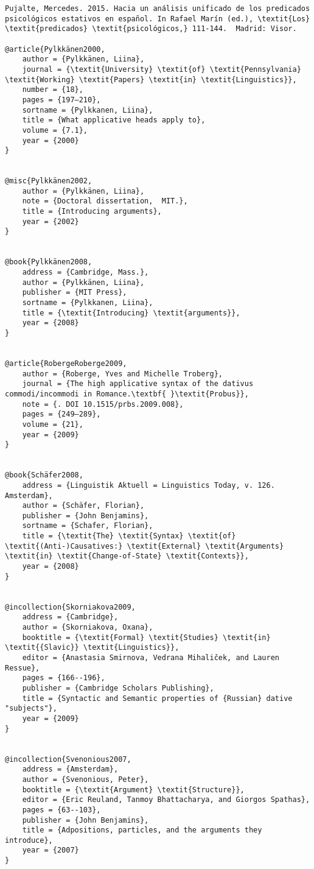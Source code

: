 \documentclass[output=paper,modfonts,nonflat]{langsci/langscibook}
\begin{document}
\begin{verbatim}
Pujalte, Mercedes. 2015. Hacia un análisis unificado de los predicados psicológicos estativos en español. In Rafael Marín (ed.), \textit{Los} \textit{predicados} \textit{psicológicos,} 111-144.  Madrid: Visor.

@article{Pylkkänen2000,
	author = {Pylkkänen, Liina},
	journal = {\textit{University} \textit{of} \textit{Pennsylvania} \textit{Working} \textit{Papers} \textit{in} \textit{Linguistics}},
	number = {18},
	pages = {197–210},
	sortname = {Pylkkanen, Liina},
	title = {What applicative heads apply to},
	volume = {7.1},
	year = {2000}
}


@misc{Pylkkänen2002,
	author = {Pylkkänen, Liina},
	note = {Doctoral dissertation,  MIT.},
	title = {Introducing arguments},
	year = {2002}
}


@book{Pylkkänen2008,
	address = {Cambridge, Mass.},
	author = {Pylkkänen, Liina},
	publisher = {MIT Press},
	sortname = {Pylkkanen, Liina},
	title = {\textit{Introducing} \textit{arguments}},
	year = {2008}
}


@article{RobergeRoberge2009,
	author = {Roberge, Yves and Michelle Troberg},
	journal = {The high applicative syntax of the dativus commodi/incommodi in Romance.\textbf{ }\textit{Probus}},
	note = {. DOI 10.1515/prbs.2009.008},
	pages = {249–289},
	volume = {21},
	year = {2009}
}


@book{Schäfer2008,
	address = {Linguistik Aktuell = Linguistics Today, v. 126. Amsterdam},
	author = {Schäfer, Florian},
	publisher = {John Benjamins},
	sortname = {Schafer, Florian},
	title = {\textit{The} \textit{Syntax} \textit{of} \textit{(Anti-)Causatives:} \textit{External} \textit{Arguments} \textit{in} \textit{Change-of-State} \textit{Contexts}},
	year = {2008}
}


@incollection{Skorniakova2009,
	address = {Cambridge},
	author = {Skorniakova, Oxana},
	booktitle = {\textit{Formal} \textit{Studies} \textit{in} \textit{{Slavic}} \textit{Linguistics}},
	editor = {Anastasia Smirnova, Vedrana Mihaliček, and Lauren Ressue},
	pages = {166--196},
	publisher = {Cambridge Scholars Publishing},
	title = {Syntactic and Semantic properties of {Russian} dative "subjects"},
	year = {2009}
}


@incollection{Svenonious2007,
	address = {Amsterdam},
	author = {Svenonious, Peter},
	booktitle = {\textit{Argument} \textit{Structure}},
	editor = {Eric Reuland, Tanmoy Bhattacharya, and Giorgos Spathas},
	pages = {63--103},
	publisher = {John Benjamins},
	title = {Adpositions, particles, and the arguments they introduce},
	year = {2007}
}



\end{verbatim}
\end{document}
